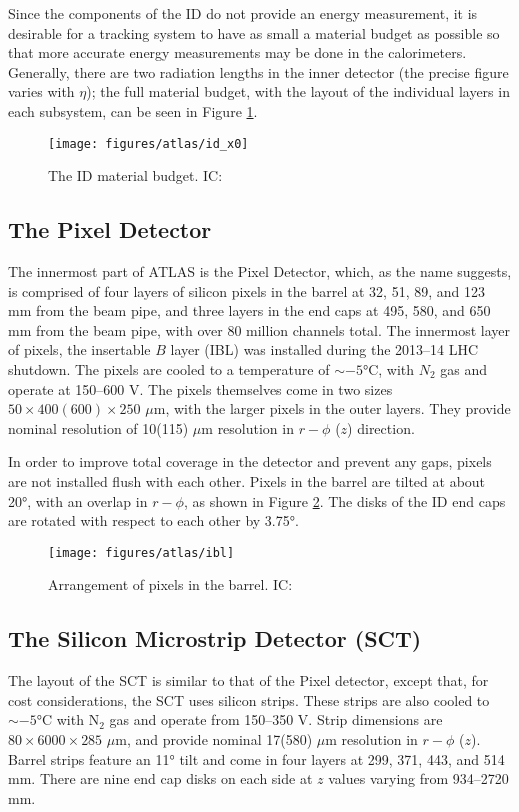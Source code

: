 Since the components of the ID do not provide an energy measurement, it is desirable for a tracking system to have as small a material budget as possible so that more accurate energy measurements may be done in the calorimeters.  Generally, there are two radiation lengths in the inner detector (the precise figure varies with $\eta$); the full material budget, with the layout of the individual layers in each subsystem, can be seen in Figure \ref{fig:idmb}.  

\begin{figure}[!htbp]\captionsetup{justification=centering}
  \centering
  \texttt{[image: figures/atlas/id\_x0]}
  \caption{The ID material budget. IC: \cite{idmaterial}}
  \label{fig:idmb}
\end{figure}

\subsection{The Pixel Detector}
The innermost part of ATLAS is the Pixel Detector, which, as the name suggests, is comprised of four layers of silicon pixels in the barrel at 32, 51, 89, and 123 mm from the beam pipe, and three layers in the end caps at 495, 580, and 650 mm from the beam pipe, with over 80 million channels total.  The innermost layer of pixels, the insertable $B$ layer (IBL) was installed during the 2013--14 LHC shutdown.  The pixels are cooled to a temperature of $\sim-\ang{5}$C, with $N_2$ gas and operate at 150--600 V.  The pixels themselves come in two sizes $50\times400(600)\times250$ $\mu$m, with the larger pixels in the outer layers.  They provide nominal resolution of 10(115) $\mu$m resolution in $r-\phi$ ($z$) direction.

In order to improve total coverage in the detector and prevent any gaps, pixels are not installed flush with each other.  Pixels in the barrel are tilted at about \ang{20}, with an overlap in $r-\phi$, as shown in Figure \ref{fig:pix}.  The disks of the ID end caps are rotated with respect to each other by \ang{3.75}.

\begin{figure}[!htbp]\captionsetup{justification=centering}
  \centering
  \texttt{[image: figures/atlas/ibl]}
  \caption{Arrangement of pixels in the barrel. IC: \cite{ibltdr}}
  \label{fig:pix}
\end{figure}

\subsection{The Silicon Microstrip Detector (SCT)}
The layout of the SCT is similar to that of the Pixel detector, except that, for cost considerations, the SCT uses silicon strips.  These strips are also cooled to $\sim-\ang{5}$C with N$_2$ gas and operate from 150--350 V.  Strip dimensions are $80\times 6 000\times285$ $\mu$m, and provide nominal  17(580) $\mu$m resolution in $r-\phi$ ($z$).  Barrel strips feature an \ang{11} tilt and come in four layers at 299, 371, 443, and 514 mm.  There are nine  end cap disks on each side at $z$ values varying from 934--2720 mm.

